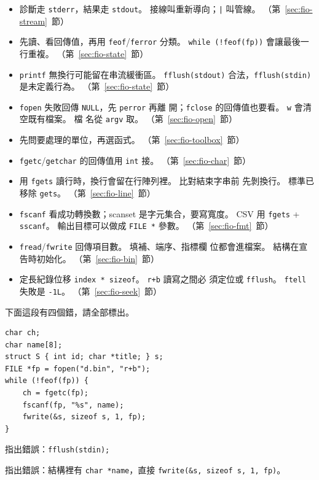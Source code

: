 \begin{itemize}
\item 診斷走 \texttt{stderr}，結果走 \texttt{stdout}。
接線叫重新導向；\texttt{|} 叫管線。
（第~\ref{sec:fio-stream}~節）
\item 先讀、看回傳值，再用 \texttt{feof}/\texttt{ferror} 分類。
\texttt{while (!feof(fp))} 會讓最後一行重複。
（第~\ref{sec:fio-state}~節）
\item \texttt{printf} 無換行可能留在串流緩衝區。
\texttt{fflush(stdout)} 合法，\texttt{fflush(stdin)} 是未定義行為。
（第~\ref{sec:fio-state}~節）
\item \texttt{fopen} 失敗回傳 \texttt{NULL}，先 \texttt{perror} 再離
開；\texttt{fclose} 的回傳值也要看。 \texttt{w} 會清空既有檔案。 檔
名從 \texttt{argv} 取。
（第~\ref{sec:fio-open}~節）
\item 先問要處理的單位，再選函式。
（第~\ref{sec:fio-toolbox}~節）
\item \texttt{fgetc}/\texttt{getchar} 的回傳值用 \texttt{int} 接。
（第~\ref{sec:fio-char}~節）
\item 用 \texttt{fgets} 讀行時，換行會留在行陣列裡。 比對結束字串前
先剝換行。 標準已移除 \texttt{gets}。
（第~\ref{sec:fio-line}~節）
\item \texttt{fscanf} 看成功轉換數；scanset 是字元集合，要寫寬度。
CSV 用 \texttt{fgets} + \texttt{sscanf}。 輸出目標可以做成
\texttt{FILE *} 參數。
（第~\ref{sec:fio-fmt}~節）
\item \texttt{fread}/\texttt{fwrite} 回傳項目數。 填補、端序、指標欄
位都會進檔案。 結構在宣告時初始化。
（第~\ref{sec:fio-bin}~節）
\item 定長紀錄位移 \texttt{index * sizeof}。 \texttt{r+b} 讀寫之間必
須定位或 \texttt{fflush}。 \texttt{ftell} 失敗是 \texttt{-1L}。
（第~\ref{sec:fio-seek}~節）
\end{itemize}

\begin{drills}[label=drills:fio-checklist]
\item 下面這段有四個錯，請全部標出。
\begin{verbatim}
char ch;
char name[8];
struct S { int id; char *title; } s;
FILE *fp = fopen("d.bin", "r+b");
while (!feof(fp)) {
    ch = fgetc(fp);
    fscanf(fp, "%s", name);
    fwrite(&s, sizeof s, 1, fp);
}
\end{verbatim}
\item 指出錯誤：\texttt{fflush(stdin);}
\item 指出錯誤：結構裡有 \texttt{char *name}，直接
\texttt{fwrite(\&s, sizeof s, 1, fp)}。
\end{drills}

